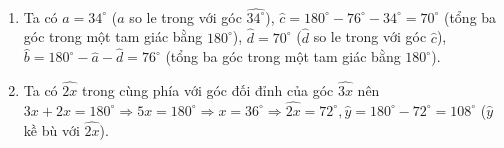 \begin{vn}
{\begin{enumerate}
		$62^{\circ}$),
		$\widehat{c} = 180- 118^{\circ} = 62^{\circ}$ ($\widehat{c}$ trong cùng phía với $\widehat{a}$).
		\item Ta có $\widehat{a} = 34^{\circ}$ ($\widehat{a}$ so le trong với góc $\widehat{34^{\circ}}$), $\widehat{c} = 180^{\circ} - 76^{\circ} - 34^{\circ} = 70^{\circ}$ (tổng ba góc trong một 
		tam giác bằng $180^{\circ}$), $\widehat{d}=70^{\circ}$
		($\widehat{d}$ so le trong với góc $\widehat{c}$), $\widehat{b}=180^{\circ} - \widehat{a}-\widehat{d} = 76^{\circ}$ (tổng ba góc trong một tam giác bằng $180^{\circ}$).
		\item Ta có $\widehat{2x}$ trong cùng phía với góc đối đỉnh của góc $\widehat{3x}$ nên $3x+2x=180^{\circ} \Rightarrow 5x=180^{\circ} \Rightarrow x = 36^{\circ} \Rightarrow 
		\widehat{2x}=72^{\circ},\widehat{y}=180^{\circ}-72^{\circ}=108^{\circ}$ ($\widehat{y}$ kề bù với $\widehat{2x}$).  
	\end{enumerate}
	}
\end{vn}
